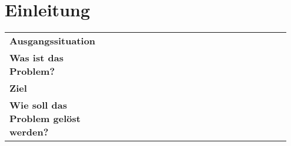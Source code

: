 \section{Einleitung}
\begin{tabular}{P{0.3\linewidth} P{0.65\linewidth}}
	\textbf{Ausgangssituation}  &  \\
		
	\textbf{Was ist das Problem?} &  \\
	
	\textbf{Ziel} &  \\
	
	\textbf{Wie soll das Problem gelöst werden?} & \\
 
\end{tabular}
\clearpage